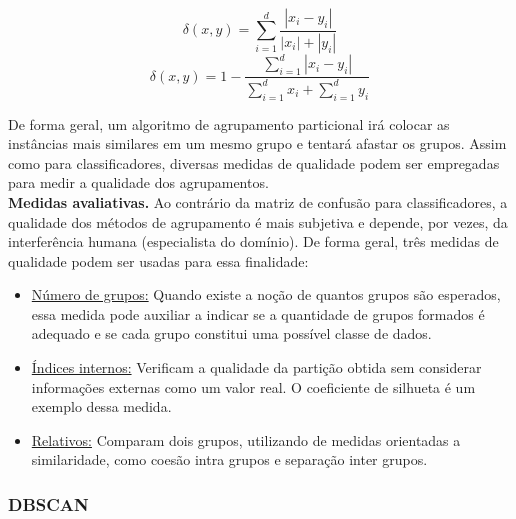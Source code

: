 \begin{equation}\label{eq:canberra}
    \delta(x, y) = \sum_{i = 1}^{d} \frac{|x_i - y_i|}{|x_i| + |y_i|}
\end{equation}
\begin{equation}\label{eq:bray}
    \delta(x, y) = 1 -  \frac{\sum_{i = 1}^{d}|x_i - y_i|}{\sum_{i = 1}^{d}x_i + \sum_{i = 1}^{d}y_i}
\end{equation}

De forma geral, um algoritmo de agrupamento particional irá colocar as instâncias mais similares em um mesmo grupo e tentará afastar os grupos.
Assim como para classificadores, diversas medidas de qualidade podem ser empregadas para medir a qualidade dos agrupamentos.\\

\noindent
\textbf{Medidas avaliativas.}
Ao contrário da matriz de confusão para classificadores, a qualidade dos métodos de agrupamento é mais subjetiva e depende, por vezes, da interferência humana (especialista do domínio).
De forma geral, três medidas de qualidade podem ser usadas para essa finalidade:

\begin{itemize}

\item \underline{Número de grupos:} 
Quando existe a noção de quantos grupos são esperados, essa medida pode auxiliar a indicar se a quantidade de grupos formados é adequado e se cada grupo constitui uma possível classe de dados.

\item \underline{Índices internos:} 
Verificam a qualidade da partição obtida sem considerar informações externas como um valor real.
O coeficiente de silhueta é um exemplo dessa medida.

\item \underline{Relativos:} 
Comparam dois grupos, utilizando de medidas orientadas a similaridade, como coesão intra grupos e separação inter grupos.
\end{itemize}

\subsubsection{DBSCAN}


